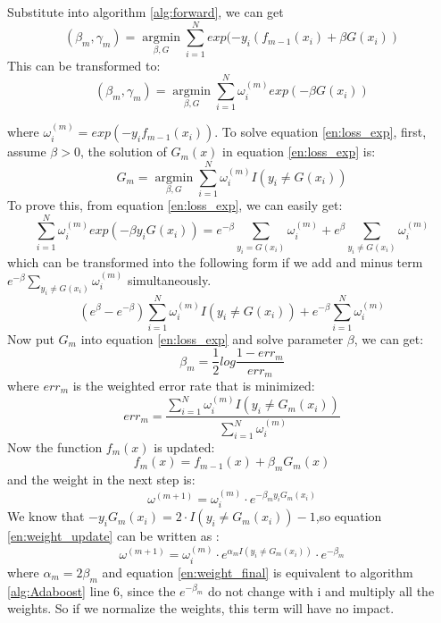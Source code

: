 Substitute into algorithm \ref{alg:forward}, we can get
\begin{equation}
(\beta_m,\gamma_m)=\underset{\beta,G}{\operatorname{argmin}}\sum_{i=1}^{N}exp(-y_i(f_{m-1}(x_i)+\beta G(x_i)) 
\end{equation}
This can be transformed to:
\begin{equation}\label{en:loss_exp}
(\beta_m,\gamma_m)=\underset{\beta,G}{\operatorname{argmin}}\sum_{i=1}^{N}\omega_i^{(m)}exp(-\beta G(x_i)) 
\end{equation}

where $\omega_i^{(m)}=exp(-y_if_{m-1}(x_i))$. To solve equation \ref {en:loss_exp}, first, assume $\beta>0$, the solution of $G_m(x)$ in equation \ref{en:loss_exp} is:
\begin{equation}
G_m=\underset{\beta,G}{\operatorname{argmin}}\sum_{i=1}^{N}\omega_i^{(m)}I(y_i\neq G(x_i)) 
\end{equation} 
To prove this, from equation \ref{en:loss_exp}, we can easily get:
\begin{equation}
\sum_{i=1}^{N}\omega_i^{(m)}exp(-\beta y_i G(x_i))=e^{-\beta}\sum_{y_i=G(x_i)}\omega_i^{(m)}+e^{\beta}\sum_{y_i\neq G(x_i)}\omega_i^{(m)}
\end{equation}
which can be transformed into the following form if we add and minus term $e^{-\beta} \sum_{y_i \neq G(x_i)}\omega_i^{(m)}$ simultaneously.
\begin{equation}
(e^\beta-e^{-\beta})\sum_{i=1}^{N}\omega_i^{(m)}I(y_i \neq G(x_i))+e^{-\beta}\sum_{i=1}^{N}\omega_i^{(m)}
\end{equation}
Now put $G_m$ into equation \ref{en:loss_exp} and solve parameter $\beta$, we can get:
\begin{equation}
\beta_m=\frac{1}{2}log\frac{1-err_m}{err_m}
\end{equation}
where $err_m$ is the weighted error rate that is minimized:
\begin{equation}
err_m=\frac{\sum_{i=1}^{N}\omega_i^{(m)}I(y_i\neq G_m(x_i))}{\sum_{i=1}^{N}\omega_i^{(m)}}
\end{equation}
Now the function $f_m(x)$ is updated:
\begin{equation}
f_m(x)=f_{m-1}(x)+\beta_mG_m(x)
\end{equation}
and the weight in the next step is:
\begin{equation}\label {en:weight_update}
\omega^{(m+1)}=\omega_i^{(m)}\cdot e^{-\beta_my_iG_m(x_i)}
\end{equation}
We know that $-y_iG_m(x_i)=2\cdot I(y_i\neq G_m(x_i))-1$,so equation \ref{en:weight_update} can be written as :
\begin{equation}\label{en:weight_final}
\omega^{(m+1)}=\omega_i^{(m)}\cdot e^{\alpha_mI(y_i \neq G_m(x_i))}\cdot e^{-\beta_m}
\end{equation}
where $\alpha_m=2\beta_m$ and equation \ref{en:weight_final} is equivalent to algorithm \ref{alg:Adaboost} line 6, since the $e^{-\beta_m}$ do not change with i and multiply all the weights. So if we normalize the weights, this term will have no impact. 


